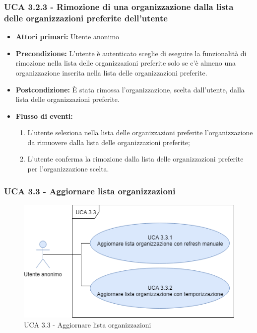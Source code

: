 \subsubsection{UCA 3.2.3 - Rimozione di una organizzazione dalla lista delle organizzazioni preferite dell'utente}%
\begin{itemize}
	\item \textbf{Attori primari:} Utente anonimo
	\item \textbf{Precondizione:}  L'utente è autenticato sceglie di eseguire la funzionalità di rimozione nella lista delle organizzazioni preferite solo se c'è almeno una organizzazione inserita nella lista delle organizzazioni preferite.
	\item \textbf{Postcondizione:} È stata rimossa l'organizzazione, scelta dall'utente, dalla lista delle organizzazioni preferite.
	\item \textbf{Flusso di eventi:}
	\begin{enumerate}
		\item L'utente seleziona nella lista delle organizzazioni preferite l'organizzazione da rimuovere dalla lista delle organizzazioni preferite;
		\item L'utente conferma la rimozione dalla lista delle organizzazioni preferite per l'organizzazione scelta.
	\end{enumerate}
\end{itemize}

\subsubsection{UCA 3.3 - Aggiornare lista organizzazioni}%

\begin{figure}[h]
	\centering
	\includegraphics[scale=0.5, center]{sezioni/UseCase/Immagini/UCA3.3.png}
	\caption{UCA 3.3 - Aggiornare lista organizzazioni}
\end{figure}

